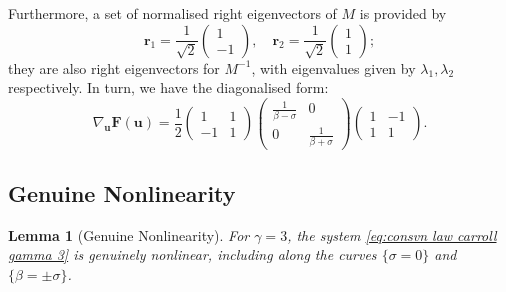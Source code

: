 \documentclass[11pt,a4paper,reqno]{amsart}
\numberwithin{equation}{section}
\newtheorem{lemma}{Lemma}[section]
\theoremstyle{definition}
\theoremstyle{remark}
\newcommand{\bu}{\mathbf{u}}
\newcommand{\bF}{\mathbf{F}}
\newcommand{\br}{\mathbf{r}}
\begin{document}
{Furthermore, a set of normalised right eigenvectors of $M$ is provided by 
\begin{equation*}
    \br_1 = \frac{1}{\sqrt{2}}\left( \begin{matrix}
        1 \\ 
        -1
    \end{matrix} \right)    , \quad \br_2 =  \frac{1}{\sqrt{2}}\left( \begin{matrix}
        1 \\ 
        1
    \end{matrix} \right); 
\end{equation*}
they are also right eigenvectors for $M^{-1}$, with eigenvalues given by $\lambda_1,\lambda_2$ respectively. In turn, we have the diagonalised form: 
\begin{equation}\label{eq:diagonalised jacobian F}
    \nabla_\bu \bF(\bu) = \frac{1}{2}\left( \begin{matrix}
        1 & 1 \\ 
        -1 & 1
    \end{matrix} \right) \left( \begin{matrix}
        \frac{1}{\beta-\sigma} & 0 \\ 
        0 & \frac{1}{\beta+\sigma} 
    \end{matrix} \right) \left( \begin{matrix}
        1 & -1 \\ 
        1 & 1
    \end{matrix} \right). 
\end{equation}

\subsection{Genuine Nonlinearity} 

\begin{lemma}[Genuine Nonlinearity]\label{lem:genuinely nonlinear}
    For $\gamma=3$, the system \eqref{eq:consvn law carroll gamma 3} is genuinely nonlinear, including along the curves $\{\sigma=0\}$ and $\{\beta = \pm \sigma\}$. 
\end{lemma}

}
\end{document}
